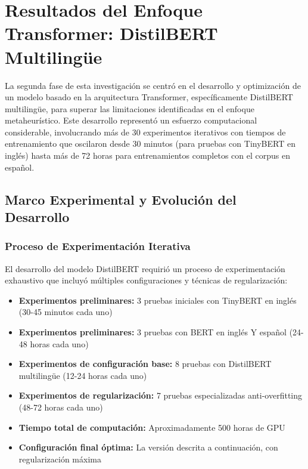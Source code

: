\section{Resultados del Enfoque Transformer: DistilBERT Multilingüe}
\label{sec:resultados_distilbert}

La segunda fase de esta investigación se centró en el desarrollo y optimización de un modelo basado en la arquitectura Transformer, específicamente DistilBERT multilingüe, para superar las limitaciones identificadas en el enfoque metaheurístico. Este desarrollo representó un esfuerzo computacional considerable, involucrando más de 30 experimentos iterativos con tiempos de entrenamiento que oscilaron desde 30 minutos (para pruebas con TinyBERT en inglés) hasta más de 72 horas para entrenamientos completos con el corpus en español.

\subsection{Marco Experimental y Evolución del Desarrollo}
\label{subsec:marco_experimental_distilbert}

\subsubsection{Proceso de Experimentación Iterativa}

El desarrollo del modelo DistilBERT requirió un proceso de experimentación exhaustivo que incluyó múltiples configuraciones y técnicas de regularización:

\begin{itemize}
    \item \textbf{Experimentos preliminares:} 3 pruebas iniciales con TinyBERT en inglés (30-45 minutos cada uno)
    \item \textbf{Experimentos preliminares:} 3 pruebas con BERT en inglés Y español (24-48 horas cada uno)
    \item \textbf{Experimentos de configuración base:} 8 pruebas con DistilBERT multilingüe (12-24 horas cada uno)
    \item \textbf{Experimentos de regularización:} 7 pruebas especializadas anti-overfitting (48-72 horas cada uno)
    \item \textbf{Tiempo total de computación:} Aproximadamente 500 horas de GPU
    \item \textbf{Configuración final óptima:} La versión descrita a continuación, con regularización máxima
\end{itemize}

